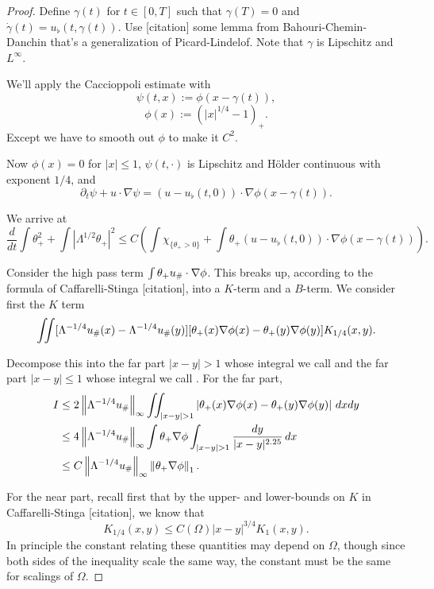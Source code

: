 \documentclass[11pt]{amsart}
\theoremstyle{remark}
\newcommand{\norm}[1]{\left\lVert#1\right\rVert}
\newcommand{\paren}[1]{\left( #1 \right)}
\newcommand{\abs}[1]{\left\lvert #1 \right\rvert}
\newcommand{\del}{\partial}
\newcommand{\grad}{\nabla}
\newcommand{\ddt}{\frac{d}{dt}}
\newcommand{\indic}[1]{\chi_{\{#1\}}}
\newcommand{\ulow}{u_\flat}
\newcommand{\uhigh}{u_{\scalebox{0.7}{\#}}}
\newcommand{\Rom}[1]{\MakeUppercase{\romannumeral #1}}
\begin{document}
\begin{proof}
Define $\gamma(t)$ for $t \in [0,T]$ such that $\gamma(T)=0$ and $\dot{\gamma}(t) = \ulow(t,\gamma(t))$.  Use [citation] some lemma from Bahouri-Chemin-Danchin that's a generalization of Picard-Lindelof.  Note that $\gamma$ is Lipschitz and $L^\infty$.  

We'll apply the Caccioppoli estimate with
\[ \psi(t,x) := \phi(x - \gamma(t)), \]
\[ \phi(x) := \paren{|x|^{1/4} - 1}_+. \]
Except we have to smooth out $\phi$ to make it $C^2$.  

Now $\phi(x) = 0$ for $|x|\leq 1$, $\psi(t,\cdot)$ is Lipschitz and H\"{o}lder continuous with exponent $1/4$, and
\[ \del_t \psi + u\cdot\grad \psi = (u - \ulow(t,0))\cdot \grad \phi(x-\gamma(t)). \]

We arrive at
\[ \ddt \int \theta_+^2 + \int \abs{\Lambda^{1/2} \theta_+}^2 \leq C \paren{ \int \indic{\theta_+ > 0} + \int \theta_+ (u-\ulow(t,0)) \cdot \grad\phi(x-\gamma(t)) }. \]

Consider the high pass term $\int \theta_+ \uhigh\cdot\grad\phi$.  This breaks up, according to the formula of Caffarelli-Stinga [citation], into a $K$-term and a $B$-term.  We consider first the $K$ term
\[ \iint [\Lambda^{-1/4} \uhigh(x)-\Lambda^{-1/4}\uhigh(y)][\theta_+(x)\grad\phi(x)-\theta_+(y)\grad\phi(y)] K_{1/4}(x,y). \]

Decompose this into the far part $|x-y|>1$ whose integral we call \Rom{1} and the far part $|x-y|\leq 1$ whose integral we call \Rom{2}.  For the far part,
\begin{align*} 
\Rom{1} &\leq 2 \norm{\Lambda^{-1/4} \uhigh}_\infty \iint_{|x-y|>1} \abs{\theta_+(x)\grad\phi(x)-\theta_+(y)\grad\phi(y)} \,dxdy
\\ &\leq 4 \norm{\Lambda^{-1/4} \uhigh}_\infty \int \theta_+\grad\phi \int_{|x-y|>1} \frac{dy}{|x-y|^{2.25}} \,dx
\\ &\leq C \norm{\Lambda^{-1/4} \uhigh}_\infty \norm{\theta_+\grad\phi}_1.
\end{align*}

For the near part, recall first that by the upper- and lower-bounds on $K$ in Caffarelli-Stinga [citation], we know that
\[ K_{1/4}(x,y) \leq C(\Omega) |x-y|^{3/4} K_1(x,y). \]
In principle the constant relating these quantities may depend on $\Omega$, though since both sides of the inequality scale the same way, the constant must be the same for scalings of $\Omega$.  


\end{proof}
\end{document}
